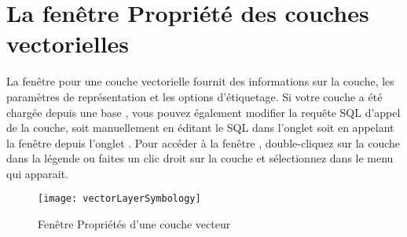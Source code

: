 \section{La fenêtre Propriété des couches vectorielles}\label{sec:vectorprops}

La fenêtre  pour une couche vectorielle fournit des informations sur la couche, les paramètres de représentation et les options d'étiquetage. Si votre couche a été chargée depuis une base \ppg, vous pouvez également modifier la requête SQL d'appel de la couche, soit manuellement en éditant le SQL dans l'onglet  soit en appelant la fenêtre  depuis l'onglet . Pour accéder à la fenêtre , double-cliquez sur la couche dans la légende ou faites un clic droit sur la couche et sélectionnez  dans le menu qui apparait.

\begin{figure}[ht]
  \begin{center}
  \texttt{[image: vectorLayerSymbology]}
  \caption{Fenêtre Propriétés d'une couche vecteur \nixcaption}\label{fig:vector_symbology}
\end{center}
\end{figure}

